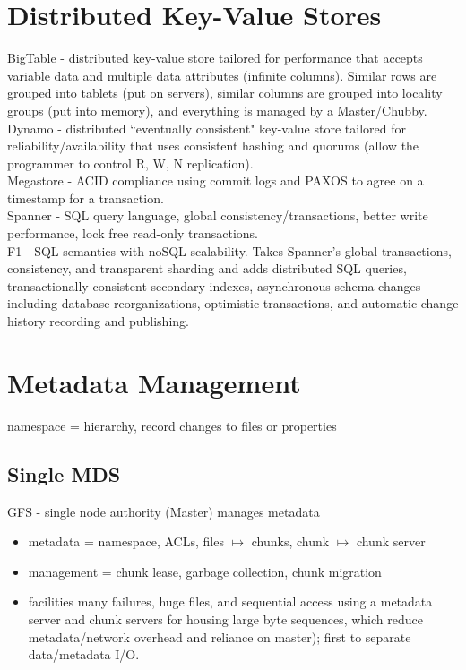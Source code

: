 \documentclass{article}
\begin{document}
\section{Distributed Key-Value Stores}
\noindent\cite{chang:osdi2006-bigtable} BigTable - distributed key-value store tailored for performance that accepts variable data and multiple data attributes (infinite columns). Similar rows are grouped into tablets (put on servers), similar columns are grouped into locality groups (put into memory), and everything is managed by a Master/Chubby.\\

\noindent\cite{decandia:sosp2007-dynamo} Dynamo - distributed ``eventually consistent" key-value store tailored for reliability/availability that uses consistent hashing and quorums (allow the programmer to control R, W, N replication).\\

\noindent\cite{} Megastore - ACID compliance using commit logs and PAXOS to agree on a timestamp for a transaction.\\

\noindent\cite{} Spanner - SQL query language, global consistency/transactions, better write performance, lock free read-only transactions.\\ 

\noindent\cite{} F1 - SQL semantics with noSQL scalability. Takes Spanner's global transactions, consistency, and transparent sharding and adds distributed SQL queries, transactionally consistent secondary indexes, asynchronous schema changes including database reorganizations, optimistic transactions, and automatic change history recording and publishing.

\section{Metadata Management}
\noindent namespace = hierarchy, record changes to files or properties\\

\subsection{Single MDS}
\noindent\cite{ghemawat:sosp2003-gfs} GFS - single node authority (Master) manages metadata
\begin{itemize}
	\item metadata = namespace, ACLs, files \(\mapsto\) chunks, chunk \(\mapsto\) chunk server
	\item management = chunk lease, garbage collection, chunk migration
	\item facilities many failures, huge files, and sequential access using a metadata server and chunk servers for housing large byte sequences, which reduce metadata/network overhead and reliance on master); first to separate data/metadata I/O.
\end{itemize}
\end{document}
